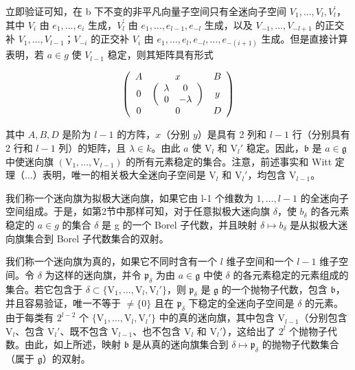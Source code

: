 立即验证可知，在 b 下不变的非平凡向量子空间只有全迷向子空间 \(V_{1},\ldots,V_{l},V_{l}^{\prime}\)，其中 \(V_{i}\) 由 \(e_{1},\ldots,e_{i}\) 生成，\(V_{l}^{\prime}\) 由 \(e_{1},\ldots,e_{l-1},e_{-l}\) 生成，以及 \(V_{-1},\ldots,V_{-l+1}\) 的正交补 \(V_{1},\ldots,V_{l-1}\)；\(V_{-i}\) 的正交补 \(V_{i}\) 由 \(e_{1},\ldots,e_{l},e_{-l},\ldots,e_{-(i+1)}\) 生成。但是直接计算表明，若 \(a\in g\) 使 \(V_{l-1}\) 稳定，则其矩阵具有形式

\[
\left( \begin{array}{c c c} A & x & B \\ 0 & \left( \begin{array}{c c} \lambda & 0 \\ 0 & - \lambda \end{array} \right) & y \\ 0 & 0 & D \end{array} \right)
\]

其中 \(A, B, D\) 是阶为 \(l - 1\) 的方阵，\(x\)（分别 \(y\)）是具有 2 列和 \(l - 1\) 行（分别具有 2 行和 \(l - 1\) 列）的矩阵，且 \(\lambda \in k\)。由此 \(a\) 使 \(\mathrm{V}_l\) 和 \(\mathrm{V}_l'\) 稳定。因此，\(\mathfrak{b}\) 是 \(a \in \mathfrak{g}\) 中使迷向旗 \((\mathrm{V}_1, \ldots, \mathrm{V}_{l-1})\) 的所有元素稳定的集合。注意，前述事实和 Witt 定理（...）表明，唯一的相关极大全迷向子空间是 \(\mathrm{V}_l\) 和 \(\mathrm{V}_l'\)，均包含 \(\mathrm{V}_{l-1}\)。

我们称一个迷向旗为拟极大迷向旗，如果它由 l-1 个维数为 \(1,\ldots,l-1\) 的全迷向子空间组成。于是，如第2节中那样可知，对于任意拟极大迷向旗 \(\delta\)，使 \(b_{\delta}\) 的各元素稳定的 \(a\in g\) 的集合 \(\delta\) 是 g 的一个 Borel 子代数，并且映射 \(\delta\mapsto b_{\delta}\) 是从拟极大迷向旗集合到 Borel 子代数集合的双射。

我们称一个迷向旗为真的，如果它不同时含有一个 \(l\) 维子空间和一个 \(l-1\) 维子空间。令 \(\delta\) 为这样的迷向旗，并令 \(\mathfrak{p}_{\delta}\) 为由 \(a \in \mathfrak{g}\) 中使 \(\delta\) 的各元素稳定的元素组成的集合。若它包含于 \(\delta \subset \{\mathrm{V}_1, \ldots, \mathrm{V}_l, \mathrm{V}_l'\}\)，则 \(\mathfrak{p}_{\delta}\) 是 \(\mathfrak{g}\) 的一个抛物子代数，包含 \(\mathfrak{b}\)，并且容易验证，唯一不等于 \(\neq \{0\}\) 且在 \(\mathfrak{p}_{\delta}\) 下稳定的全迷向子空间是 \(\delta\) 的元素。由于每类有 \(2^{l-2}\) 个 \(\{\mathrm{V}_1, \ldots, \mathrm{V}_l, \mathrm{V}_l'\}\) 中的真的迷向旗，其中包含 \(\mathrm{V}_{l-1}\)（分别包含 \(\mathrm{V}_l\)、包含 \(\mathrm{V}_l'\)、既不包含 \(\mathrm{V}_{l-1}\)、也不包含 \(\mathrm{V}_l\) 和 \(\mathrm{V}_l'\)），这给出了 \(2^l\) 个抛物子代数。由此，如上所述，映射 \(\mathfrak{b}\) 是从真的迷向旗集合到 \(\delta \mapsto \mathfrak{p}_{\delta}\) 的抛物子代数集合（属于 \(\mathfrak{g}\)）的双射。

